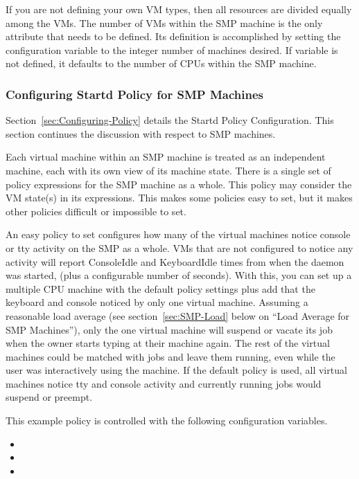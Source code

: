 If you are not defining your own VM types, then all resources
are divided equally among the VMs.
The number of VMs within the SMP machine is the only attribute
that needs to be defined.
Its definition is accomplished by setting the configuration
variable  to the
integer number of machines desired.
If variable  is not defined,
it defaults to the number of CPUs within the SMP machine.


\subsubsection{\label{sec:Config-SMP-Policy}
Configuring Startd Policy for SMP Machines}

Section~\ref{sec:Configuring-Policy} details the Startd
Policy Configuration.
This section continues the discussion with respect to SMP machines.

Each virtual machine within an SMP machine is treated as an
independent machine,
each with its own view of its machine state.
There is a single set of policy expressions for the SMP machine
as a whole.
This policy may consider the VM state(s) in its expressions.
This makes some policies easy to set, but it makes
other policies difficult or impossible to set.

An easy policy to set
configures how many of the virtual machines
notice console or tty activity on the SMP as a whole.
VMs that are not configured to notice any activity will report
ConsoleIdle and KeyboardIdle times from when the
 daemon was started,
(plus a configurable number of seconds).
With this, you can set up a multiple CPU machine with
the default policy
settings plus add that the keyboard and console noticed by only one
virtual machine.
Assuming a reasonable load average (see
section~\ref{sec:SMP-Load} below on ``Load Average for SMP
Machines''), only the one virtual machine will suspend or vacate its job
when the owner starts typing at their machine again.
The rest of the virtual machines could be matched with jobs and leave
them running, even while the user was interactively using the
machine. 
If the default policy is used,
all virtual machines notice
tty and console activity
and
currently running jobs would suspend or preempt.

This example policy is
controlled with the following configuration variables.
\begin{itemize}
\item {}
\item {}
\item {}
\end{itemize}

